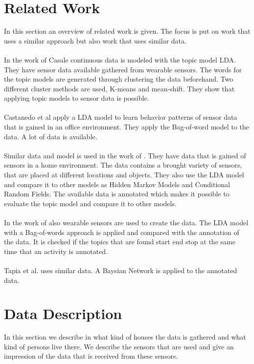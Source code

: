 \documentclass[11pt,a4paper]{article}
\begin{document}
\section{Related Work}
In this section an overview of related work is given. The focus is put on work that uses a similar approach but also work that uses similar data.\\
\\
In the work of Casale \cite{Casale:2009} continuous data is modeled with the topic model LDA. They have sensor data available gathered from wearable sensors. The words for the topic models are generated through clustering the data beforehand. Two different cluster methods are used, K-means and mean-shift. They show that applying topic models to sensor data is possible.\\
\\
Castanedo et al \cite{EXSY:EXSY12033} apply a LDA model to learn behavior patterns of sensor data that is gained in an office environment. They apply the Bag-of-word model to the data. A lot of data is available.\\
\\
Similar data and model is used in the work of \cite{journals/percom/ChikhaouiWP12}. They have data that is gained of sensors in a home environment. The data contains a brought variety of sensors, that are placed at different locations and objects. They also use the LDA model and compare it to other models as Hidden Markov Models and Conditional Random Fields. The available data is annotated which makes it possible to evaluate the topic model and compare it to other models.\\
\\
In the work of \cite{Huynh:2008:DAP:1409635.1409638} also wearable sensors are used to create the data. The LDA model with a Bag-of-words approach is applied and compared with the annotation of the data. It is checked if the topics that are found start end stop at the same time that an activity is annotated.\\
\\
Tapia et al. \cite{Tapia04activityrecognition} uses similar data. A Baysian Network is applied to the annotated data.





\pagebreak


\section{Data Description}
\label{sec:DataDesc}
In this section we describe in what kind of houses the data is gathered and what kind of persons live there. We describe the sensors that are used and give an impression of the data that is received from these sensors.
\end{document}
